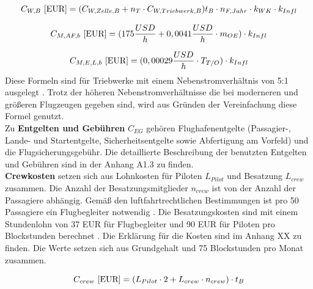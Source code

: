\begin{equation}
   {C_{W,B} ~[\text{EUR}]} = (C_{W,Zelle,B} + n_{T} \cdot C_{W,Triebwerk,B} ) t_{B} \cdot n_{F, Jahr} \cdot k_{WK} \cdot k_{Infl}\\
   \label{maintenance}
\end{equation}

\begin{equation}
   {C_{M,AF,b} ~[\text{EUR}]} = (175 \frac{USD}{h} + 0,0041 \frac{USD}{h} \cdot m_{OE} )\cdot k_{Infl}\\
   \label{maintenance Zelle}
\end{equation}

\begin{equation}
   {C_{M,E,L,b} ~[\text{EUR}]} = (0,00029 \frac{USD}{h} \cdot T_{T/O} )\cdot k_{Infl}\\
   \label{maintenance engine}
\end{equation}
%
Diese Formeln sind für Triebwerke mit einem Nebenstromverhältnis von 5:1 ausgelegt \cite{bruge2018wartungskosten}. %
Trotz der höheren Nebenstromverhältnisse die bei moderneren und größeren Flugzeugen gegeben sind,
wird aus Gründen der Vereinfachung diese Formel genutzt.\\
%
%

Zu \textbf{Entgelten und Gebühren} $C_{EG}$ gehören Flughafenentgelte 
(Passagier-, Lande- und Startentgelte, Sicherheitsentgelte sowie Abfertigung am Vorfeld)
und die Flugsicherungsgebühr. 
Die detaillierte Beschreibung der benutzten Entgelten und Gebühren sind in der Anhang A1.3 zu finden.\\ %

\textbf{Crewkosten} setzen sich aus Lohnkosten für Piloten $L_{Pilot}$ und Besatzung $L_{crew}$ zusammen. 
Die Anzahl der Besatzungsmitglieder $n_{crew}$ ist von der Anzahl der Passagiere abhängig. 
Gemäß den luftfahrtrechtlichen Bestimmungen ist pro 50 Passagiere ein Flugbegleiter notwendig \cite{conrady2019luftverkehr}.
Die Besatzungskosten sind mit einem Stundenlohn von 37 EUR für Flugbegleiter 
und 90 EUR für Piloten pro Blockstunden berechnet \cite{discover_airlines_cabin}.
Die Erklärung für die Kosten sind im Anhang XX zu finden. %
Die Werte setzen sich aus Grundgehalt und 75 Blockstunden pro Monat zusammen.

\begin{equation}
   {C_{crew} ~[\text{EUR}]} = ({L}_{Pilot} \cdot 2 + {L}_{crew} \cdot n_{crew} ) \cdot t_{B} \\
   \label{crew cost}
\end{equation}

